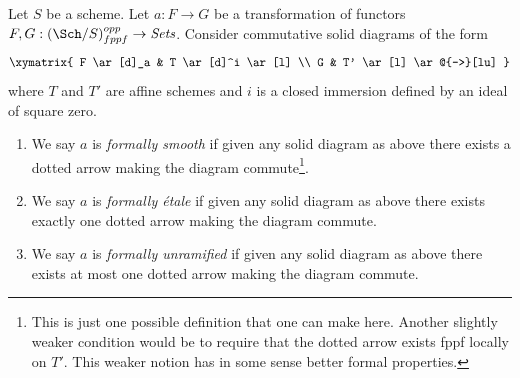 \begin{definition}
\label{definition-formally-smooth-etale-unramified}
Let $S$ be a scheme.
Let $a : F \to G$ be a transformation of functors
$F, G : (\Sch/S)_{fppf}^{opp} \to \textit{Sets}$.
Consider commutative solid diagrams of the form
$$
\xymatrix{
F \ar[d]_a & T \ar[d]^i \ar[l] \\
G & T' \ar[l] \ar@{-->}[lu]
}
$$
where $T$ and $T'$ are affine schemes and $i$ is a closed immersion
defined by an ideal of square zero.
\begin{enumerate}
\item We say $a$ is {\it formally smooth} if given any solid
diagram as above there exists a dotted arrow making the diagram
commute\footnote{This is just one possible definition that one can
make here. Another slightly weaker condition would be to require that
the dotted arrow exists fppf locally on $T'$. This weaker notion
has in some sense better formal properties.}.
\item We say $a$ is {\it formally \'etale} if given any solid
diagram as above there exists exactly one dotted arrow making the diagram
commute.
\item We say $a$ is {\it formally unramified} if given any solid
diagram as above there exists at most one dotted arrow making the diagram
commute.
\end{enumerate}
\end{definition}